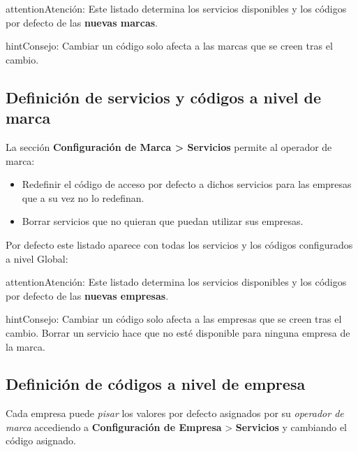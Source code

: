 \documentclass[letterpaper,10pt,spanish]{sphinxmanual}
\begin{document}
\begin{notice}{attention}{Atención:}
Este listado determina los servicios disponibles y los códigos por defecto de las \textbf{nuevas marcas}.
\end{notice}

\begin{notice}{hint}{Consejo:}
Cambiar un código solo afecta a las marcas que se creen tras el cambio.
\end{notice}


\subsection{Definición de servicios y códigos a nivel de marca}
\label{pbx_features/services:services-and-codes-for-brands}
La sección \textbf{Configuración de Marca \textgreater{} Servicios} permite al operador de marca:
\begin{itemize}
\item {} 
Redefinir el código de acceso por defecto a dichos servicios para las empresas que a su vez no lo redefinan.

\item {} 
Borrar servicios que no quieran que puedan utilizar sus empresas.

\end{itemize}

Por defecto este listado aparece con todas los servicios y los códigos configurados a nivel Global:

\begin{notice}{attention}{Atención:}
Este listado determina los servicios disponibles y los códigos por defecto de las \textbf{nuevas empresas}.
\end{notice}

\begin{notice}{hint}{Consejo:}
Cambiar un código solo afecta a las empresas que se creen tras el cambio. Borrar un servicio hace que no esté disponible para ninguna empresa de la marca.
\end{notice}


\subsection{Definición de códigos a nivel de empresa}
\label{pbx_features/services:services-and-codes-for-companies}
Cada empresa puede \emph{pisar} los valores por defecto asignados por su \emph{operador de marca} accediendo a \textbf{Configuración de Empresa} \textgreater{} \textbf{Servicios} y cambiando el código asignado.
\end{document}
